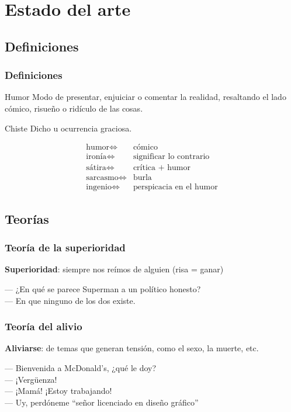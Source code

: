 \section{Estado del arte}

\subsection{Definiciones}
\begin{frame}[allowframebreaks]
    \frametitle{Definiciones}

    \begin{block}{Humor}
        Modo de presentar, enjuiciar o comentar la realidad, resaltando el lado cómico, risueño o ridículo de las cosas.  
    \end{block}
    \begin{block}{Chiste}
        Dicho u ocurrencia graciosa.
    \end{block}

    \framebreak
        
    \begin{align*}
        \text{humor} \iff&  \text{cómico} \\
        \text{ironía} \iff& \text{significar lo contrario} \\
        \text{sátira} \iff& \text{crítica + humor} \\
        \text{sarcasmo} \iff& \text{burla} \\
        \text{ingenio}  \iff& \text{perspicacia en el humor}
    \end{align*}
\end{frame}

\subsection{Teorías}
\begin{frame}
    \frametitle{Teoría de la superioridad}

    \textbf{Superioridad}: siempre nos reímos de alguien (risa = ganar)
    \begin{example}
        --- ¿En qué se parece Superman a un político honesto? \\
        --- En que ninguno de los dos existe.
    \end{example}
\end{frame}

\begin{frame}
    \frametitle{Teoría del alivio}

    \textbf{Aliviarse}: de temas que generan tensión, como el sexo, la muerte, etc.
    \begin{example}
        --- Bienvenida a McDonald’s, ¿qué le doy? \\
        --- ¡Vergüenza! \\
        --- ¡Mamá! ¡Estoy trabajando! \\
        --- Uy, perdóneme ``señor licenciado en diseño gráfico'' \\
    \end{example}
\end{frame}

